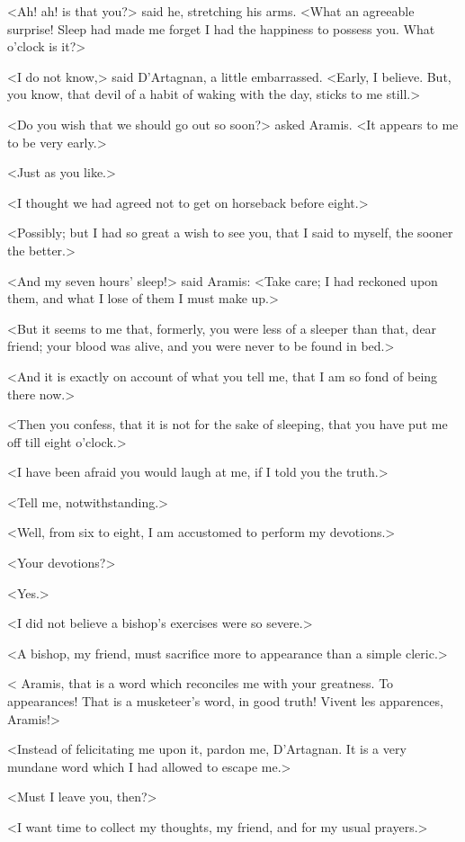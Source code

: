 <Ah! ah! is that you?> said he, stretching his arms. <What an agreeable surprise!  Sleep had made me forget I had the happiness to possess you. What o'clock is it?>

<I do not know,> said D'Artagnan, a little embarrassed. <Early, I believe. But, you know, that devil of a habit of waking with the day, sticks to me still.>

<Do you wish that we should go out so soon?> asked Aramis. <It appears to me to be very early.>

<Just as you like.>

<I thought we had agreed not to get on horseback before eight.>

<Possibly; but I had so great a wish to see you, that I said to myself, the sooner the better.>

<And my seven hours' sleep!> said Aramis: <Take care; I had reckoned upon them, and what I lose of them I must make up.>

<But it seems to me that, formerly, you were less of a sleeper than that, dear friend; your blood was alive, and you were never to be found in bed.>

<And it is exactly on account of what you tell me, that I am so fond of being there now.>

<Then you confess, that it is not for the sake of sleeping, that you have put me off till eight o'clock.>

<I have been afraid you would laugh at me, if I told you the truth.>

<Tell me, notwithstanding.>

<Well, from six to eight, I am accustomed to perform my devotions.>

<Your devotions?>

<Yes.>

<I did not believe a bishop's exercises were so severe.>

<A bishop, my friend, must sacrifice more to appearance than a simple cleric.>

< Aramis, that is a word which reconciles me with your greatness. To appearances! That is a musketeer's word, in good truth! Vivent les apparences, Aramis!>

<Instead of felicitating me upon it, pardon me, D'Artagnan. It is a very mundane word which I had allowed to escape me.>

<Must I leave you, then?>

<I want time to collect my thoughts, my friend, and for my usual prayers.>

